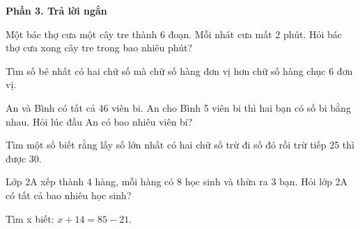 \textbf{Phần 3. Trả lời ngắn}

\begin{ex} %
Một bác thợ cưa một cây tre thành 6 đoạn. Mỗi nhát cưa mất 2 phút. Hỏi bác thợ cưa xong cây tre trong bao nhiêu phút?
\end{ex}

\begin{ex} %
Tìm số bé nhất có hai chữ số mà chữ số hàng đơn vị hơn chữ số hàng chục 6 đơn vị.
\end{ex}

\begin{ex} %
An và Bình có tất cả 46 viên bi. An cho Bình 5 viên bi thì hai bạn có số bi bằng nhau. Hỏi lúc đầu An có bao nhiêu viên bi?
\end{ex}

\begin{ex} %
Tìm một số biết rằng lấy số lớn nhất có hai chữ số trừ đi số đó rồi trừ tiếp 25 thì được 30.
\end{ex}

\begin{ex} %
Lớp 2A xếp thành 4 hàng, mỗi hàng có 8 học sinh và thừa ra 3 bạn. Hỏi lớp 2A có tất cả bao nhiêu học sinh?
\end{ex}

\begin{ex} %
Tìm x biết: $x + 14 = 85 - 21$.
\end{ex}
